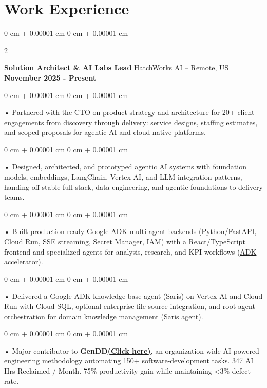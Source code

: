 \documentclass[10pt, letterpaper]{article}
\newenvironment{onecolentry}{
    \begin{adjustwidth}{
        0 cm + 0.00001 cm
    }{
        0 cm + 0.00001 cm
    }
}{
    \end{adjustwidth}
} %
\newenvironment{twocolentry}[2][]{
    \onecolentry
    \def\secondColumn{#2}
    \setcolumnwidth{\fill, 4.5 cm}
    \begin{paracol}{2}
}{
    \switchcolumn \raggedleft \secondColumn
    \end{paracol}
    \endonecolentry
} %
\begin{document}
    \vspace{0.5cm}
    \section{Work Experience}
        \vspace{0.1cm}

        \begin{twocolentry}{
            \textbf{November 2025 - Present}
        }
            \textbf{Solution Architect \& AI Labs Lead} HatchWorks AI -- Remote, US\end{twocolentry}

        \begin{onecolentry}
             • Partnered with the CTO on product strategy and architecture for 20+ client engagements from discovery through delivery: service designs, staffing estimates, and scoped proposals for agentic AI and cloud-native platforms.
        \end{onecolentry}
        \begin{onecolentry}
             • Designed, architected, and prototyped agentic AI systems with foundation models, embeddings, LangChain, Vertex AI, and LLM integration patterns, handing off stable full-stack, data-engineering, and agentic foundations to delivery teams.
        \end{onecolentry}
        \begin{onecolentry}
             • Built production-ready Google ADK multi-agent backends (Python/FastAPI, Cloud Run, SSE streaming, Secret Manager, IAM) with a React/TypeScript frontend and specialized agents for analysis, research, and KPI workflows (\href{https://github.com/sreenikethaathreya-hw/adksolutionsaccelerator}{ADK accelerator}).
        \end{onecolentry}
        \begin{onecolentry}
             • Delivered a Google ADK knowledge-base agent (Saris) on Vertex AI and Cloud Run with Cloud SQL, optional enterprise file-source integration, and root-agent orchestration for domain knowledge management (\href{https://github.com/sreenikethaathreya-hw/SRS-Saris-multi-agent}{Saris agent}).
        \end{onecolentry}
        \begin{onecolentry}
             • Major contributor to \textbf{GenDD}\href{https://hatchworks.com/generative-driven-development/}{\textbf{(Click here)}}, an organization-wide AI-powered engineering methodology automating 150+ software-development tasks. 347 AI Hrs Reclaimed / Month. 75\% productivity gain while maintaining <3\% defect rate.
        \end{onecolentry}
\end{document}
